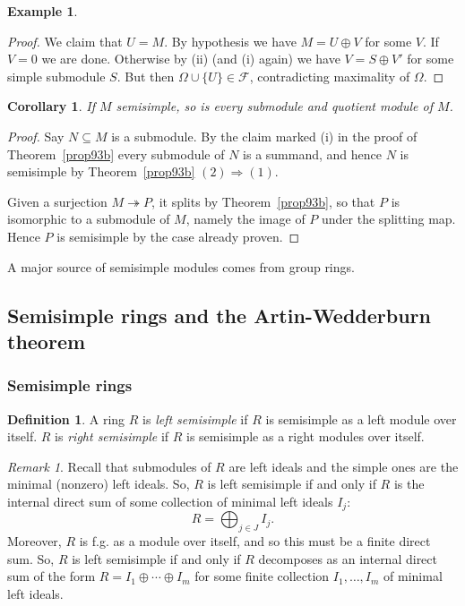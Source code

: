 \documentclass{amsart}[12pt]
\newcommand{\onto}{\twoheadrightarrow}
\def\sF{\mathscr  F}
\newcommand{\DEF}[1]{\emph{#1}\index{#1}}
\numberwithin{equation}{section}
\theoremstyle{plain} %
\newtheorem{cor}[equation]{Corollary}
\theoremstyle{definition}
\newtheorem{defn}[equation]{Definition}
\newtheorem{ex}[equation]{Example}
\theoremstyle{remark}
\newtheorem{rem}[equation]{Remark}
\newcommand{\sssec}[1]{\subsubsection{#1}}
\begin{document}
\begin{ex}
\begin{proof}
We claim that $U=M$. By hypothesis we have $M = U \oplus V$ for some $V$. 
If $V = 0$ we are done. Otherwise by (ii) (and (i) again) we have $V = S \oplus V'$ for some simple submodule $S$. But then $\Omega \cup \{ U\} \in \sF$, contradicting maximality of $\Omega$.
\end{proof}


\begin{cor} \label{cor93}
If $M$  semisimple, so is every submodule and quotient module of $M$.
\end{cor}

\begin{proof} Say $N \subseteq M$ is a submodule. By the claim marked (i) in the proof of Theorem~\ref{prop93b} every submodule of $N$ is a summand, and hence $N$ is semisimple by Theorem~\ref{prop93b} $(2)\Rightarrow (1)$.
  
  Given a surjection $M \onto P$, it splits by Theorem~\ref{prop93b}, so that $P$ is isomorphic to a submodule of $M$, namely the image of $P$ under the splitting map. Hence $P$ is semisimple by the case already proven.
\end{proof}

A major source of semisimple modules comes from group rings.


\subsection{Semisimple rings and the Artin-Wedderburn theorem}

\sssec{Semisimple rings}

\begin{defn} A ring $R$ is \DEF{left semisimple} if  $R$ is semisimple as a left module over itself. 
$R$ is  \DEF{right semisimple} if $R$ is semisimple as a right modules over itself.
\end{defn}

\begin{rem}
Recall that submodules of $R$  are left ideals and the simple ones are the minimal (nonzero) left ideals. So, $R$ is left semisimple if and only if  $R$ is the internal direct sum of some collection of minimal left ideals $I_j$:
$$
R = \bigoplus_{j \in J} I_j.
$$
Moreover, $R$ is f.g. as a module over itself, and so this must be a {finite direct sum}. So, $R$ is left semisimple if and only if
$R$ decomposes as an internal direct sum of the form
$R = I_1 \oplus \cdots \oplus I_m$ for some finite collection $I_1, \dots, I_m$ of minimal left ideals.
\end{rem}


\end{ex}
\end{document}
